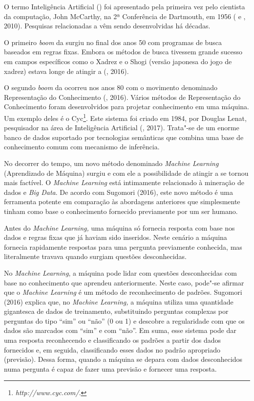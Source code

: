 O termo Inteligência Artificial () foi apresentado pela primeira vez
pelo cientista da computação, John McCarthy, na 2ª Conferência de
Dartmouth, em 1956 ( e , 2010). Pesquisas relacionadas a 
vêm sendo desenvolvidas há décadas.

O primeiro \emph{boom} da  surgiu no final dos anos 50 com programas
de busca baseados em regras fixas. Embora os métodos de busca tivessem
grande sucesso em campos específicos como o Xadrez e o Shogi (versão
japonesa do jogo de xadrez) estava longe de atingir a  (,
2016).

O segundo \emph{boom} da  ocorreu nos anos 80 com o movimento
denominado Representação do Conhecimento (, 2016). Vários
métodos de Representação do Conhecimento foram desenvolvidos para
projetar conhecimento em uma máquina. Um exemplo deles é o Cyc\footnote{\emph{http://www.cyc.com/}.}.
Este sistema foi criado em 1984, por Douglas Lenat, pesquisador na área
de Inteligência Artificial (, 2017). Trata"-se de um enorme banco
de dados suportado por tecnologias semânticas que combina uma base de
conhecimento comum com mecanismo de inferência.

No decorrer do tempo, um novo método denominado \emph{Machine Learning}
(Aprendizado de Máquina) surgiu e com ele a possibilidade de atingir a
 se tornou mais factível. O \emph{Machine Learning} está intimamente
relacionado à mineração de dados e \emph{Big Data}. De acordo com
Sugomori (2016), este novo método é uma ferramenta potente em comparação
às abordagens anteriores que simplesmente tinham como base o
conhecimento fornecido previamente por um ser humano.

Antes do \emph{Machine Learning,} uma máquina só fornecia resposta com
base nos dados e regras fixas que já haviam sido inseridos. Neste
cenário a máquina fornecia rapidamente respostas para uma pergunta
previamente conhecida, mas literalmente travava quando surgiam questões
desconhecidas.

No \emph{Machine Learning}, a máquina pode lidar com questões
desconhecidas com base no conhecimento que aprendeu anteriormente. Neste
caso, pode"-se afirmar que o \emph{Machine Learning} é um método de
reconhecimento de padrões. Sugomori (2016) explica que, no \emph{Machine
Learning,} a máquina utiliza uma quantidade gigantesca de dados de
treinamento, substituindo perguntas complexas por perguntas do tipo
``sim'' ou ``não'' (0 ou 1) e descobre a regularidade com que os dados
são marcados com ``sim'' e com ``não''. Em suma, esse sistema pode dar
uma resposta reconhecendo e classificando os padrões a partir dos dados
fornecidos e, em seguida, classificando esses dados no padrão apropriado
(previsão). Dessa forma, quando a máquina se depara com dados
desconhecidos numa pergunta é capaz de fazer uma previsão e fornecer uma
resposta.

